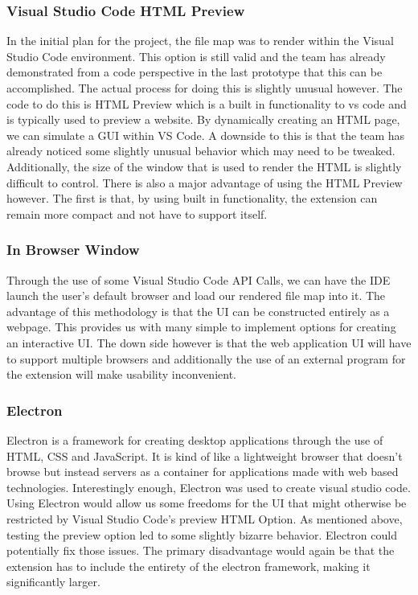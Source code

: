 \documentclass[letterpaper,10pt,titlepage,draftclsnofoot,onecolumn,onesided] {IEEEtran}
\begin{document}
\subsubsection{Visual Studio Code HTML Preview}
In the initial plan for the project, the file map was to render within the Visual Studio Code environment. 
This option is still valid and the team has already demonstrated from a code perspective in the last prototype that this can be accomplished. 
The actual process for doing this is slightly unusual however. 
The code to do this is HTML Preview which is a built in functionality to vs code and is typically used to preview a website. 
By dynamically creating an HTML page, we can simulate a GUI within VS Code. 
A downside to this is that the team has already noticed some slightly unusual behavior which may need to be tweaked. 
Additionally, the size of the window that is used to render the HTML is slightly difficult to control. 
There is also a major advantage of using the HTML Preview however. 
The first is that, by using built in functionality, the extension can remain more compact and not have to support itself.

\subsubsection{In Browser Window}
Through the use of some Visual Studio Code API Calls, we can have the IDE launch the user's default browser and load our rendered file map into it.
The advantage of this methodology is that the UI can be constructed entirely as a webpage. 
This provides us with many simple to implement options for creating an interactive UI. 
The down side however is that the web application UI will have to support multiple browsers and additionally the use of an external program for the extension will make usability inconvenient. 

\subsubsection{Electron}
Electron is a framework for creating desktop applications through the use of HTML, CSS and JavaScript. 
It is kind of like a lightweight browser that doesn't browse but instead servers as a container for applications made with web based technologies. 
Interestingly enough, Electron was used to create visual studio code. 
Using Electron would allow us some freedoms for the UI that might otherwise be restricted by Visual Studio Code's preview HTML Option. 
As mentioned above, testing the preview option led to some slightly bizarre behavior. 
Electron could potentially fix those issues. 
The primary disadvantage would again be that the extension has to include the entirety of the electron framework, making it significantly larger.
\end{document}

